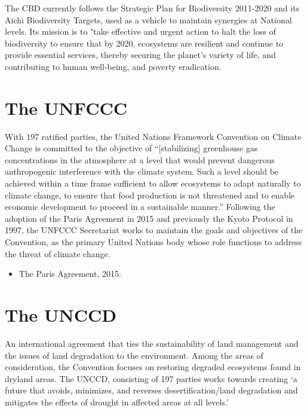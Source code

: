 \documentclass[]{book}
\providecommand{\tightlist}{%
  \setlength{\itemsep}{0pt}\setlength{\parskip}{0pt}}
\begin{document}
The CBD currently follows the Strategic Plan for Biodiversity 2011-2020 and its Aichi Biodiversity Targets, used as a vehicle to maintain synergies at National levels. Its mission is to "take effective and urgent action to halt the loss of biodiversity to ensure that by 2020, ecosystems are resilient and continue to provide essential services, thereby securing the planet's variety of life, and contributing to human well-being, and poverty eradication.

\hypertarget{the-unfccc}{%
\section{The UNFCCC}\label{the-unfccc}}

With 197 ratified parties, the United Nations Framework Convention on Climate Change is committed to the objective of ``{[}stabilizing{]} greenhouse gas concentrations in the atmosphere at a level that would prevent dangerous anthropogenic interference with the climate system. Such a level should be achieved within a time frame sufficient to allow ecosystems to adapt naturally to climate change, to ensure that food production is not threatened and to enable economic development to proceed in a sustainable manner.'' Following the adoption of the Paris Agreement in 2015 and previously the Kyoto Protocol in 1997, the UNFCCC Secretariat works to maintain the goals and objectives of the Convention, as the primary United Nations body whose role functions to address the threat of climate change.

\begin{itemize}
\tightlist
\item
  The Paris Agreement, 2015:
\end{itemize}

\hypertarget{the-unccd}{%
\section{The UNCCD}\label{the-unccd}}

An international agreement that ties the sustainability of land management and the issues of land degradation to the environment. Among the areas of consideration, the Convention focuses on restoring degraded ecosystems found in dryland areas. The UNCCD, consisting of 197 parties works towards creating `a future that avoids, minimizes, and reverses desertification/land degradation and mitigates the effects of drought in affected areas at all levels.'
\end{document}
